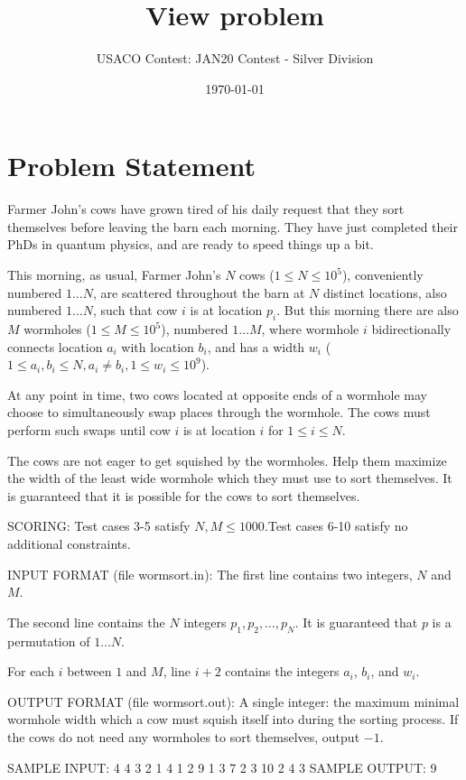 \documentclass[12pt]{article}
\title{View problem}
\author{USACO Contest: JAN20 Contest - Silver Division}
\date{\today}
\begin{document}
\maketitle

\section*{Problem Statement}

Farmer John's cows have grown tired of his daily request that they sort
themselves before leaving the barn each morning. They have just completed their
PhDs in quantum physics, and are ready to speed things up a bit.

This morning, as usual, Farmer John's $N$ cows ($1 \leq N \leq 10^5$),
conveniently numbered $1 \dots N$, are scattered throughout the barn at $N$
distinct locations, also numbered $1 \dots N$, such that cow $i$ is at location
$p_i$. But this morning there are also $M$ wormholes ($1 \leq M \leq 10^5$),
numbered $1 \dots M$, where wormhole $i$ bidirectionally connects location $a_i$
with location $b_i$, and has a width $w_i$ 
($1\le a_i,b_i\le N, a_i\neq b_i, 1\le w_i\le 10^9$).

At any point in time, two cows located at opposite ends of a wormhole may choose
to simultaneously swap places through the wormhole. The cows must perform such
swaps until cow $i$ is at location $i$ for $1 \leq i \leq N$.

The cows are not eager to get squished by the wormholes. Help them maximize the
width of the least wide wormhole which they must use to sort themselves.
It is guaranteed that it is possible for the cows to sort themselves.

SCORING:
Test cases 3-5 satisfy $N,M\le 1000.$Test cases 6-10 satisfy no additional constraints.

INPUT FORMAT (file wormsort.in):
The first line contains two integers, $N$ and $M$.

The second line contains the $N$ integers $p_1, p_2, \dots, p_N$. It is
guaranteed that $p$ is a permutation of $1\ldots N.$

For each $i$ between $1$ and $M$, line $i+2$ contains the integers $a_i$, $b_i$,
and $w_i$. 

OUTPUT FORMAT (file wormsort.out):
A single integer: the maximum minimal wormhole width which a cow must squish
itself into during the sorting process. If the cows do not need any wormholes to
sort themselves, output $-1$. 

SAMPLE INPUT:
4 4
3 2 1 4
1 2 9
1 3 7
2 3 10
2 4 3
SAMPLE OUTPUT: 
9
\end{document}
